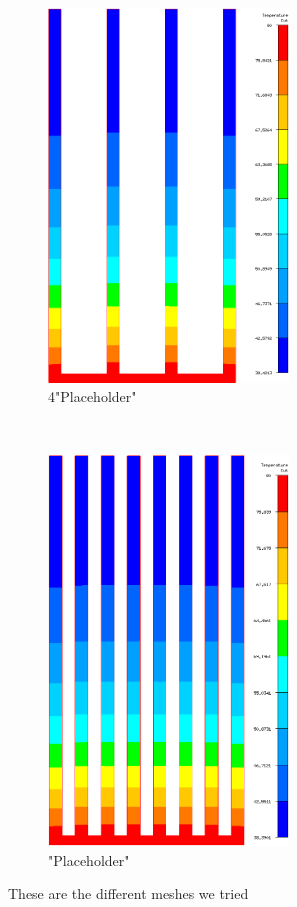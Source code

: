\begin{figure}[h]
\begin{subfigure}[t] {0.23\textwidth}
 \includegraphics[width=0.7\textwidth]{../figures/heatsink4_h205_gmf005.png}
 \caption{4"Placeholder"}
 \label{fig:res_4_2}
 \end{subfigure}
 ~
 \begin{subfigure}[t] {0.23\textwidth}
 \centering
 \includegraphics[width=0.7\textwidth]{../figures/heatsink8_h205_gmf005.png}
 \caption{"Placeholder"}
 \label{fig:res_8_2}
 \end{subfigure}
 \caption{These are the different meshes we tried}
 \label{fig:meshes}
 \end{figure}
 
